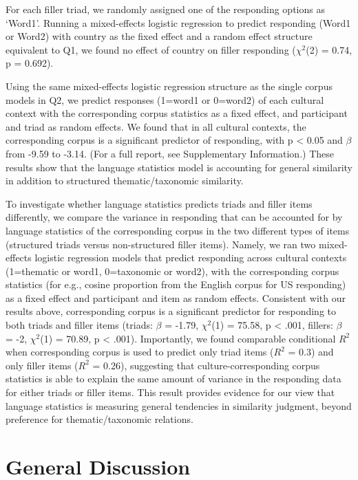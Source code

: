 \documentclass[10pt, letterpaper]{article}
\begin{document}
For each filler triad, we randomly assigned one of the responding
options as `Word1'. Running a mixed-effects logistic regression to
predict responding (Word1 or Word2) with country as the fixed effect and
a random effect structure equivalent to Q1, we found no effect of
country on filler responding (\(\chi^2\)(2) = 0.74, p = 0.692).

Using the same mixed-effects logistic regression structure as the single
corpus models in Q2, we predict responses (1=word1 or 0=word2) of each
cultural context with the corresponding corpus statistics as a fixed
effect, and participant and triad as random effects. We found that in
all cultural contexts, the corresponding corpus is a significant
predictor of responding, with p \textless{} 0.05 and \(\beta\) from
-9.59 to -3.14. (For a full report, see Supplementary Information.)
These results show that the language statistics model is accounting for
general similarity in addition to structured thematic/taxonomic
similarity.

To investigate whether language statistics predicts triads and filler
items differently, we compare the variance in responding that can be
accounted for by language statistics of the corresponding corpus in the
two different types of items (structured triads versus non-structured
filler items). Namely, we ran two mixed-effects logistic regression
models that predict responding across cultural contexts (1=thematic or
word1, 0=taxonomic or word2), with the corresponding corpus statistics
(for e.g., cosine proportion from the English corpus for US responding)
as a fixed effect and participant and item as random effects. Consistent
with our results above, corresponding corpus is a significant predictor
for responding to both triads and filler items (triads: \(\beta\) =
-1.79, \(\chi^2\)(1) = 75.58, p \textless{} .001, fillers: \(\beta\) =
-2, \(\chi^2\)(1) = 70.89, p \textless{} .001). Importantly, we found
comparable conditional \(R^2\) when corresponding corpus is used to
predict only triad items (\(R^2\) = 0.3) and only filler items (\(R^2\)
= 0.26), suggesting that culture-corresponding corpus statistics is able
to explain the same amount of variance in the responding data for either
triads or filler items. This result provides evidence for our view that
language statistics is measuring general tendencies in similarity
judgment, beyond preference for thematic/taxonomic relations.

\hypertarget{general-discussion}{%
\section{General Discussion}\label{general-discussion}}
\end{document}
